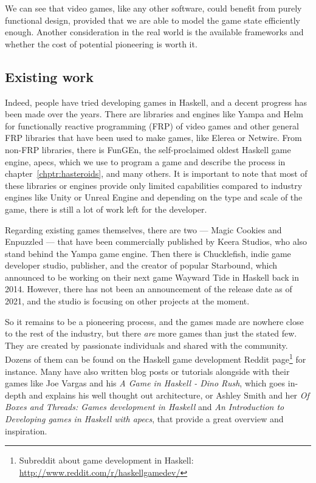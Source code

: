 \documentclass[
  digital, %
  color,   %
  table,   %
  oneside, %
  lof,     %
  lot,     %
]{fithesis3}
\begin{document}
We can see that video games, like any other software, could benefit from
purely functional design, provided that we are able to model the
game state efficiently enough. Another consideration in the real world
is the available frameworks and whether the cost of potential
pioneering is worth it.


\subsection{Existing work}
\label{sect:existing}
Indeed, people have tried developing games in Haskell, and a decent
progress has been made over the years. There are libraries and engines like Yampa\cite{yamparepo}
and Helm\cite{helmrepo} for functionally reactive programming (FRP) of video games and
other general FRP libraries that have been used to make games, like Elerea\cite{elerearepo}
or Netwire\cite{netwirerepo}. From non-FRP libraries, there is
FunGEn\cite{fungenrepo}, the self-proclaimed oldest Haskell game engine,
apecs\cite{apecsrepo}, which we use to program a game and describe the process
in chapter~\ref{chptr:hasteroids}, and many others. It is important to note that
most of these libraries or engines provide only limited capabilities
compared to  industry engines like Unity or Unreal Engine
and depending on the type and scale of the game, there is still a lot
of work left for the developer.

Regarding existing games themselves, there are two --- Magic Cookies and
Enpuzzled --- that have been commercially published by Keera Studios,
who also stand behind the Yampa game engine\cite{keerastudios}.
Then there is Chucklefish, indie game developer studio, publisher, and
the creator of popular Starbound, which announced to be working on their next
game Wayward Tide in Haskell back in 2014\cite{waywardtide}. However, there
has not been an announcement of the release date as of 2021, and the studio is
focusing on other projects at the moment.

So it remains to be a pioneering process, and the games made are nowhere close
to the rest of the industry, but there \emph{are} more games than just the stated few.
They are created by passionate individuals and shared with the community. Dozens of them can be found
on the Haskell game development Reddit page\footnote{
Subreddit about game development in Haskell: \url{http://www.reddit.com/r/haskellgamedev/}
}
for instance. Many have also written blog posts or tutorials alongside with
their games like Joe Vargas and his \textit{A Game in Haskell - Dino Rush}\cite{dinorush},
which goes in-depth and explains his well thought out architecture,
or Ashley Smith and her \textit{Of Boxes and Threads: Games development in Haskell}\cite{aashaskell}
and \textit{An Introduction to Developing games in Haskell with apecs}\cite{aasapecs},
that provide a great overview and inspiration.
\end{document}
